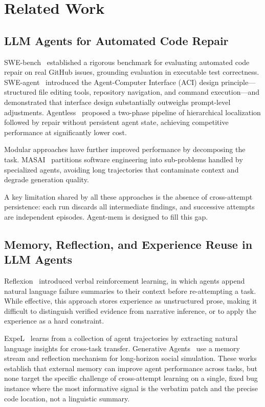 \documentclass[runningheads]{llncs}
\begin{document}
\section{Related Work}

\subsection{LLM Agents for Automated Code Repair}

SWE-bench~\cite{jimenez2024swebench} established a rigorous benchmark for evaluating automated code repair on real GitHub issues, grounding evaluation in executable test correctness. SWE-agent~\cite{yang2024sweagent} introduced the Agent-Computer Interface (ACI) design principle---structured file editing tools, repository navigation, and command execution---and demonstrated that interface design substantially outweighs prompt-level adjustments. Agentless~\cite{xia2024agentless} proposed a two-phase pipeline of hierarchical localization followed by repair without persistent agent state, achieving competitive performance at significantly lower cost.

Modular approaches have further improved performance by decomposing the task. MASAI~\cite{arora2024masai} partitions software engineering into sub-problems handled by specialized agents, avoiding long trajectories that contaminate context and degrade generation quality.

A key limitation shared by all these approaches is the absence of cross-attempt persistence: each run discards all intermediate findings, and successive attempts are independent episodes. Agent-mem is designed to fill this gap.

\subsection{Memory, Reflection, and Experience Reuse in LLM Agents}

Reflexion~\cite{shinn2023reflexion} introduced verbal reinforcement learning, in which agents append natural language failure summaries to their context before re-attempting a task. While effective, this approach stores experience as unstructured prose, making it difficult to distinguish verified evidence from narrative inference, or to apply the experience as a hard constraint.

ExpeL~\cite{zhao2024expel} learns from a collection of agent trajectories by extracting natural language insights for cross-task transfer. Generative Agents~\cite{park2023generative} use a memory stream and reflection mechanism for long-horizon social simulation. These works establish that external memory can improve agent performance across tasks, but none target the specific challenge of cross-attempt learning on a single, fixed bug instance where the most informative signal is the verbatim patch and the precise code location, not a linguistic summary.
\end{document}
